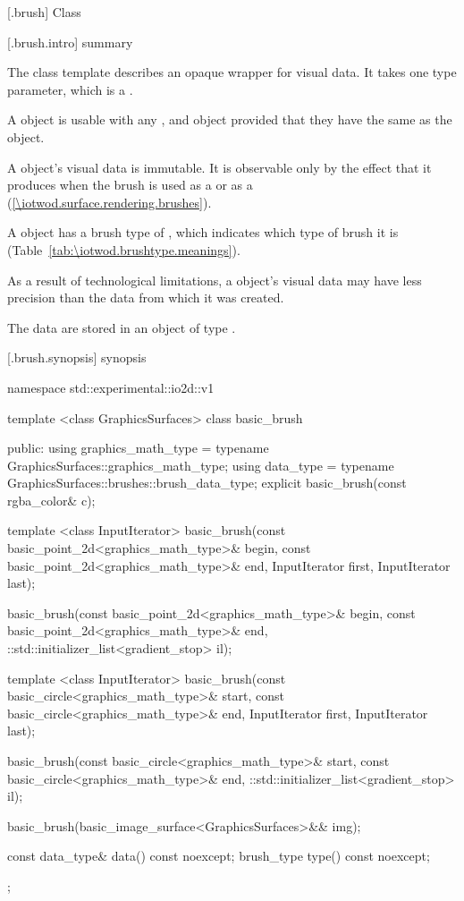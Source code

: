  [\iotwod.brush] {Class }

 [\iotwod.brush.intro] { summary}

\pnum
{}%
The class template  describes an opaque wrapper for visual data. It takes one type parameter, which is a \graphicssurfacestemplparamnospace.

\pnum
A  object is usable with any  , and  object provided that they have the same \graphicssurfacestemplparam as the  object.

\pnum
A  object's visual data is immutable. It is observable only by the effect that it produces when the brush is used as a  or as a  (\ref{\iotwod.surface.rendering.brushes}).

\pnum
A  object has a brush type of , which indicates which type of brush it is (Table~\ref{tab:\iotwod.brushtype.meanings}).

\pnum
As a result of technological limitations, a  object's visual data may have less precision than the data from which it was created.

\pnum
The data are stored in an object of type .

 [\iotwod.brush.synopsis] { synopsis}

\begin{codeblock}
namespace std::experimental::io2d::v1 {
template <class GraphicsSurfaces>
class basic_brush {
  public:
    using graphics_math_type = typename GraphicsSurfaces::graphics_math_type;
    using data_type = typename GraphicsSurfaces::brushes::brush_data_type;
    explicit basic_brush(const rgba_color& c);

    template <class InputIterator>
    basic_brush(const basic_point_2d<graphics_math_type>& begin,
      const basic_point_2d<graphics_math_type>& end,
      InputIterator first, InputIterator last);

    basic_brush(const basic_point_2d<graphics_math_type>& begin,
      const basic_point_2d<graphics_math_type>& end,
      ::std::initializer_list<gradient_stop> il);

    template <class InputIterator>
    basic_brush(const basic_circle<graphics_math_type>& start,
      const basic_circle<graphics_math_type>& end,
      InputIterator first, InputIterator last);

    basic_brush(const basic_circle<graphics_math_type>& start,
      const basic_circle<graphics_math_type>& end,
      ::std::initializer_list<gradient_stop> il);

    basic_brush(basic_image_surface<GraphicsSurfaces>&& img);
    
    const data_type& data() const noexcept;
    brush_type type() const noexcept;
  };
}
\end{codeblock}


